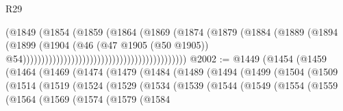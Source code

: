\begin{lexlean}{R29}
\begin{coremodule}
                                                                  (@1849
                                                                    (@1854
                                                                      (@1859
                                                                        (@1864
                                                                          (@1869
                                                                            (@1874
                                                                              (@1879
                                                                                (@1884
                                                                                  (@1889
                                                                                    (@1894
                                                                                      (@1899
                                                                                        (@1904
                                                                                          (@46
                                                                                            (@47
                                                                                              @1905
                                                                                              (@50
                                                                                                @1905))
                                                                                            @54))))))))))))))))))))))))))))))))))))))))))))
@2002 := @1449
    (@1454
      (@1459
        (@1464
          (@1469
            (@1474
              (@1479
                (@1484
                  (@1489
                    (@1494
                      (@1499
                        (@1504
                          (@1509
                            (@1514
                              (@1519
                                (@1524
                                  (@1529
                                    (@1534
                                      (@1539
                                        (@1544
                                          (@1549
                                            (@1554
                                              (@1559
                                                (@1564
                                                  (@1569
                                                    (@1574
                                                      (@1579
                                                        (@1584

\end{coremodule}
\end{lexlean}
